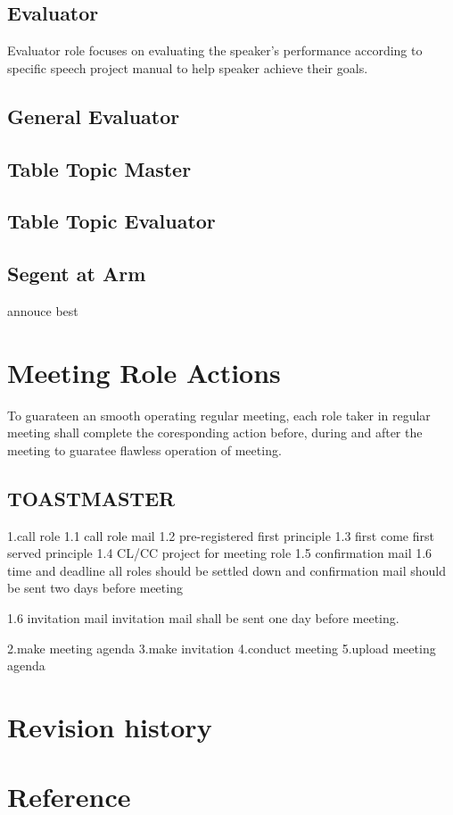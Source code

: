 \subsection{Evaluator}
Evaluator role focuses on evaluating the speaker's performance according to
specific speech project manual to help speaker achieve their goals. 

\subsection{General Evaluator}

\subsection{Table Topic Master}
\subsection{Table Topic Evaluator}
\subsection{Segent at Arm}
annouce best


\section{Meeting Role Actions}

To guarateen an smooth operating regular meeting, each role taker 
in regular meeting shall complete the coresponding action before,
during and after the meeting to guaratee flawless operation of 
meeting. 

\subsection{TOASTMASTER}

1.call role
1.1 call role mail
1.2 pre-registered first principle
1.3 first come first served principle
1.4 CL/CC project for meeting role
1.5 confirmation mail
1.6 time and deadline
    all roles should be settled down and confirmation mail 
    should be sent two days before meeting

1.6 invitation mail
    invitation mail shall be sent one day before meeting.


2.make meeting agenda
3.make invitation
4.conduct meeting
5.upload meeting agenda


\section{Revision history}
\section{Reference}




